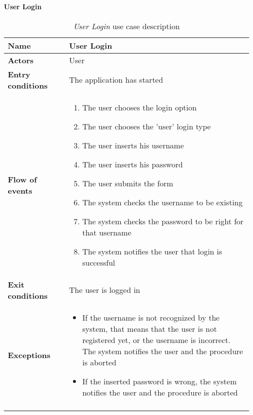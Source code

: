 		\paragraph{User Login}
		\begin{longtable}{p{0.25\linewidth}p{0.75\linewidth}}
			\toprule
			\textbf{Name} & \textbf{User Login} \\
			\midrule
			\textbf{Actors} & User \\
			\midrule
			\textbf{Entry conditions} & The application has started \\
			\midrule
			\textbf{Flow of events} & 
			\begin{enumerate}
				\item The user chooses the login option
				\item The user chooses the 'user' login type
				\item The user inserts his username
				\item The user inserts his password
				\item The user submits the form
				\item The system checks the username to be existing
				\item The system checks the password to be right for that username
				\item The system notifies the user that login is successful
			\end{enumerate} \\
			\midrule
			\textbf{Exit conditions} & The user is logged in\\
			\midrule
			\textbf{Exceptions} & 
			\begin{itemize}
				\item If the username is not recognized by the system, that means that the user is not registered yet, or the username is incorrect. The system notifies the user and the procedure is aborted
				\item If the inserted password is wrong, the system notifies the user and the procedure is aborted			
			\end{itemize} \\
			\bottomrule
			\caption{\emph{User Login} use case description}
		\end{longtable}
	
